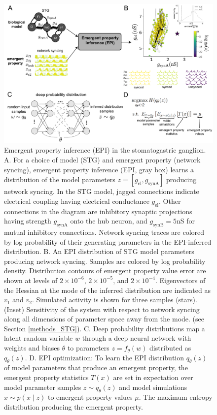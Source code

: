 \documentclass[11pt]{article}
\begin{document}
\begin{figure}
\begin{center}
\includegraphics[scale=0.35]{figures/fig1/fig1.pdf}
\end{center}
\caption{Emergent property inference (EPI) in the stomatogastric ganglion.  A. For a choice of model (STG) and emergent property (network syncing), emergent property inference (EPI, gray box) learns a distribution of the model parameters $z = \left[g_{\text{el}}, g_{\text{synA}} \right]$ producing network syncing.  In the STG model, jagged connections indicate electrical coupling having electrical conductance $g_{\text{el}}$. Other connections in the diagram are inhibitory synaptic projections having strength $g_{\text{synA}}$ onto the hub neuron, and $g_{\text{synB}}=5$nS for mutual inhibitory connections.  Network syncing traces are colored by log probability of their generating parameters in the EPI-inferred distribution.  B. An EPI distribution of STG model parameters producing network syncing.  Samples are colored by log probability density.  Distribution contours of emergent property value error are shown at levels of $2 \times 10^{-6}$, $2 \times 10^{-5}$, and $2 \times 10^{-4}$.  Eigenvectors of the Hessian at the mode of the inferred distribution are indicated as $v_1$ and $v_2$.  Simulated activity is shown for three samples (stars). (Inset) Sensitivity of the system with respect to network syncing along all dimensions of parameter space away from the mode. (see Section \ref{methods_STG}).  C. Deep probability distributions map a latent random variable $w$ through a deep neural network with weights and biases $\theta$ to parameters $z = f_\theta(w)$ distributed as $q_\theta(z)$. D. EPI optimization: To learn the EPI distribution $q_\theta(z)$ of model parameters that produce an emergent property, the emergent property statistics $T(x)$ are set in expectation over model parameter samples $z \sim q_\theta(z)$ and model simulations $x \sim p(x \mid z)$ to emergent property values $\mu$. The maximum entropy distribution producing the emergent property. }
 \label{fig:STG}
\end{figure}
\end{document}
